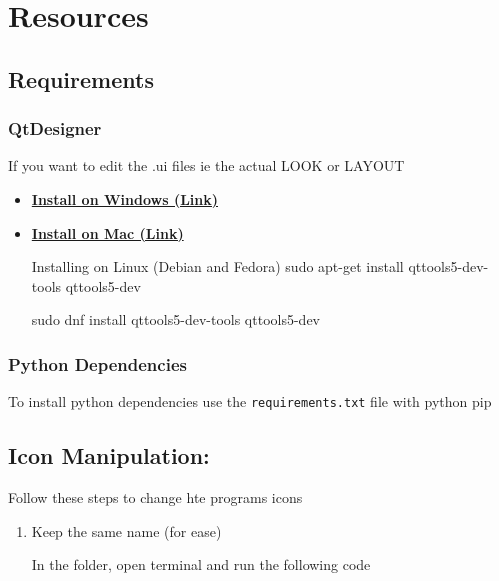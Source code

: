 \documentclass[landscape,a4paper,]{beamer}
\newcommand\myheading[1]{%
  \par\bigskip
  {\Large\bfseries#1}\par\smallskip}
\newcommand\mysubheading[1]{%
  \par\bigskip
  {\Medium\bfseries#1}\par\smallskip}
\begin{document}
\newpage
\section{Resources}
\label{sec:org7bd709f}
\myheading{\insertsectionhead}

\subsection{Requirements}
\label{sec:org0ceccbb}
\mysubheading{\insertsubsectionhead}

\subsubsection{QtDesigner}
\label{sec:org7bc29de}
If you want to edit the .ui files ie the actual LOOK or LAYOUT
\begin{itemize}
\item \href{https://build-system.fman.io/static/public/files/Qt\%20Designer\%20Setup.exe}{\textbf{\textbf{Install on Windows (Link)}}}
\item \href{https://build-system.fman.io/static/public/files/Qt\%20Designer.dmg}{\textbf{\textbf{Install on Mac (Link)}}}
\begin{block}{Installing on Linux (Debian and Fedora)}
sudo apt-get install qttools5-dev-tools qttools5-dev

sudo dnf install qttools5-dev-tools qttools5-dev

\end{block}
\end{itemize}
\subsubsection{Python Dependencies}
\label{sec:org03faeef}
To install python dependencies use the \texttt{requirements.txt} file with python pip

\subsection{Icon Manipulation:}
\label{sec:orgd388344}
\mysubheading{\insertsubsectionhead}

Follow these steps to change hte programs icons
\begin{enumerate}
\item Keep the same name (for ease)
\begin{exampleblock}{In the folder, open terminal and run the following code}
\end{exampleblock}
\end{enumerate}
\end{document}
